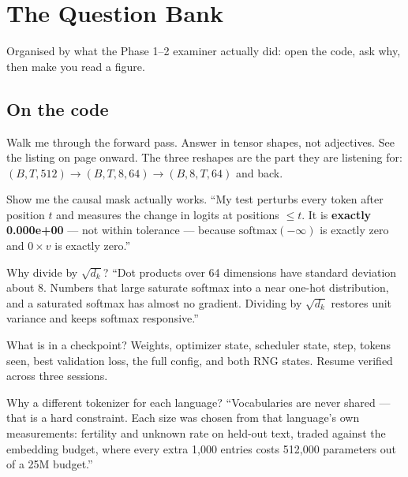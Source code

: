 \documentclass[11pt]{report}
\begin{document}
\chapter{The Question Bank}
\label{ch:bank}

Organised by what the Phase 1--2 examiner actually did: open the code, ask why,
then make you read a figure.

\section{On the code}

\begin{qabox}{Walk me through the forward pass.}
Answer in tensor shapes, not adjectives. See the listing on page
\pageref{ch:cheat} onward. The three reshapes are the part they are listening
for: $(B,T,512) \rightarrow (B,T,8,64) \rightarrow (B,8,T,64)$ and back.
\end{qabox}

\begin{qabox}{Show me the causal mask actually works.}
``My test perturbs every token after position $t$ and measures the change in
logits at positions $\le t$. It is \textbf{exactly 0.000e+00} --- not within
tolerance --- because $\mathrm{softmax}(-\infty)$ is exactly zero and
$0 \times v$ is exactly zero.''
\end{qabox}

\begin{qabox}{Why divide by $\sqrt{d_k}$?}
``Dot products over 64 dimensions have standard deviation about 8. Numbers that
large saturate softmax into a near one-hot distribution, and a saturated softmax
has almost no gradient. Dividing by $\sqrt{d_k}$ restores unit variance and
keeps softmax responsive.''
\end{qabox}

\begin{qabox}{What is in a checkpoint?}
Weights, optimizer state, scheduler state, step, tokens seen, best validation
loss, the full config, and both RNG states. Resume verified across three
sessions.
\end{qabox}

\begin{qabox}{Why a different tokenizer for each language?}
``Vocabularies are never shared --- that is a hard constraint. Each size was
chosen from that language's own measurements: fertility and unknown rate on
held-out text, traded against the embedding budget, where every extra 1,000
entries costs 512,000 parameters out of a 25M budget.''
\end{qabox}
\end{document}

